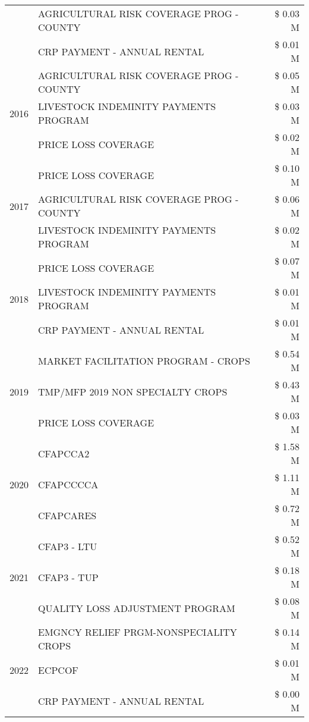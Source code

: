 \begin{tabular}{llr}
 & AGRICULTURAL RISK COVERAGE PROG - COUNTY & \$ 0.03 M \\
 & CRP PAYMENT - ANNUAL RENTAL & \$ 0.01 M \\
\cline{1-3}
\multirow[t]{3}{*}{2016} & AGRICULTURAL RISK COVERAGE PROG - COUNTY & \$ 0.05 M \\
 & LIVESTOCK INDEMINITY PAYMENTS PROGRAM & \$ 0.03 M \\
 & PRICE LOSS COVERAGE & \$ 0.02 M \\
\cline{1-3}
\multirow[t]{3}{*}{2017} & PRICE LOSS COVERAGE & \$ 0.10 M \\
 & AGRICULTURAL RISK COVERAGE PROG - COUNTY & \$ 0.06 M \\
 & LIVESTOCK INDEMINITY PAYMENTS PROGRAM & \$ 0.02 M \\
\cline{1-3}
\multirow[t]{3}{*}{2018} & PRICE LOSS COVERAGE & \$ 0.07 M \\
 & LIVESTOCK INDEMINITY PAYMENTS PROGRAM & \$ 0.01 M \\
 & CRP PAYMENT - ANNUAL RENTAL & \$ 0.01 M \\
\cline{1-3}
\multirow[t]{3}{*}{2019} & MARKET FACILITATION PROGRAM - CROPS & \$ 0.54 M \\
 & TMP/MFP 2019 NON SPECIALTY CROPS & \$ 0.43 M \\
 & PRICE LOSS COVERAGE & \$ 0.03 M \\
\cline{1-3}
\multirow[t]{3}{*}{2020} & CFAPCCA2 & \$ 1.58 M \\
 & CFAPCCCCA & \$ 1.11 M \\
 & CFAPCARES & \$ 0.72 M \\
\cline{1-3}
\multirow[t]{3}{*}{2021} & CFAP3 - LTU & \$ 0.52 M \\
 & CFAP3 - TUP & \$ 0.18 M \\
 & QUALITY LOSS ADJUSTMENT PROGRAM & \$ 0.08 M \\
\cline{1-3}
\multirow[t]{3}{*}{2022} & EMGNCY RELIEF PRGM-NONSPECIALITY CROPS & \$ 0.14 M \\
 & ECPCOF & \$ 0.01 M \\
 & CRP PAYMENT - ANNUAL RENTAL & \$ 0.00 M \\
\cline{1-3}
\bottomrule
\end{tabular}
